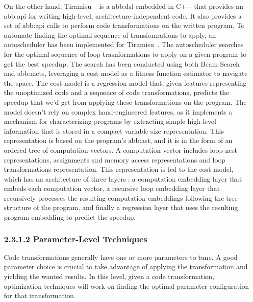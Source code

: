                 On the other hand, Tiramisu ~\cite{tiramisu} is a \gls{abb:dsl} embedded in C++ that provides an \gls{abb:api} for writing high-level, architecture-independent code. It also provides a set of  \gls{abb:api} calls to perform code transformations on the written program. To automate finding the optimal sequence of transfomrations to apply, an autoscheduler has been implemented for Tiramisu~\cite{tiramisu-autosched}. The autoscheduler searches for the optimal sequence of loop trasnformations to apply on a given program to get the best speedup. The search has been conducted using both Beam Search and \gls{abb:mcts}, leveraging a cost model as a fitness function estimator to navigate the space. The cost model is a regression model that,  given features representing the unoptimized code and a sequence of code transformations,  predicts the speedup that we’d get from applying these transformations on the program. The model doesn’t rely on complex hand-engineered features, as it implements a mechanism for characterizing programs by extracting simple high-level information that is stored in a compact variable-size representation. This representation is based on the program’s \gls{abb:ast}, and it is in the form of an ordered tree of computation vectors. A computation vector includes loop nest representations, assignments and memory access representations and loop transformations representation. This representation is fed to the cost model, which has an architecture of three layers : a computation embedding layer that embeds each computation vector, a recursive loop embedding layer that recursively processes the resulting computation embeddings following the tree structure of the program,  and finally a regression layer that uses the resulting program embedding to predict the speedup.

                
            
            
        \subsubsection{2.3.1.2   Parameter-Level Techniques}
            Code transformations generally have one or more parameters to tune. A good parameter choice is crucial to take advantage of applying the transformation and yielding the wanted results. In this level, given a code transformation, optimization techniques will work on finding the optimal parameter configuration for that transformation.
            
